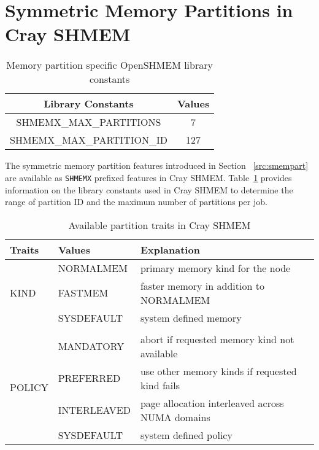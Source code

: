 \section{Symmetric Memory Partitions in Cray SHMEM}
\label{src:implement}
\begin{table}[h!]
\centering
\vspace{-20pt}
\begin{tabular}{|c c|}\hline
    Library Constants & Values \\[0.5ex]
    \hline\hline
    SHMEMX\_MAX\_PARTITIONS & 7 \\
    SHMEMX\_MAX\_PARTITION\_ID & 127 \\
    \hline
\end{tabular}
\caption{Memory partition specific OpenSHMEM library constants}
\label{tab:const}
\end{table}
\vspace{-20pt}

The symmetric memory partition features introduced in Section
~\ref{src:smempart} are available as \texttt{SHMEMX} prefixed
features in Cray SHMEM. Table~\ref{tab:const} provides information
on the library constants used in Cray SHMEM to determine the
range of partition ID and the maximum number of partitions per job.

\begin{table}[h!]
\centering
\vspace{-20pt}
\begin{tabular}{|l l l|}\hline
    Traits & Values & Explanation\\[0.5ex]
    \hline\hline
    \multirow{3}{4em}{KIND} & NORMALMEM  & primary memory kind for
                                           the node \\
                            & FASTMEM    & faster memory in addition
                                           to NORMALMEM \\
                            & SYSDEFAULT & system defined memory \\
                            &&\\
    \multirow{4}{4em}{POLICY} & MANDATORY   & abort if requested memory
                                              kind not available \\
                              & PREFERRED   & use other memory kinds if
                                              requested kind fails \\
                              & INTERLEAVED & page allocation interleaved
                                              across NUMA domains \\
                              & SYSDEFAULT  & system defined policy \\
    \hline
\end{tabular}
\caption{Available partition traits in Cray SHMEM}
\label{tab:trait}
\end{table}
\vspace{-20pt}

